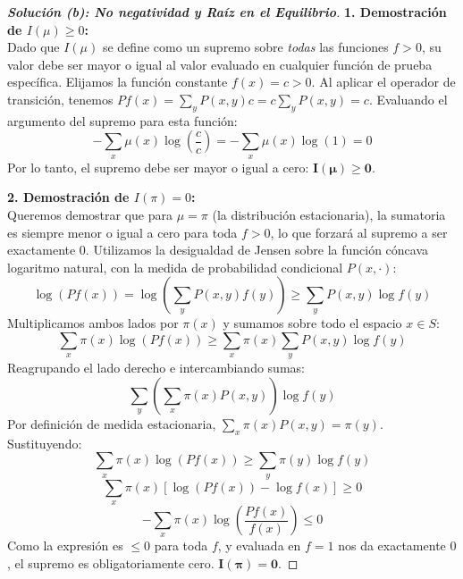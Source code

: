 \documentclass[10pt,a4paper]{article}
\begin{document}
\begin{proof}[\textbf{Solución (b): No negatividad y Raíz en el Equilibrio}]
    \textbf{1. Demostración de $I(\mu) \ge 0$:} \\
    Dado que $I(\mu)$ se define como un supremo sobre \textit{todas} las funciones $f > 0$, su valor debe ser mayor o igual al valor evaluado en cualquier función de prueba específica.
    Elijamos la función constante $f(x) = c > 0$. 
    Al aplicar el operador de transición, tenemos $Pf(x) = \sum_y P(x,y)c = c \sum_y P(x,y) = c$.
    Evaluando el argumento del supremo para esta función:
    \[ -\sum_x \mu(x) \log \left( \frac{c}{c} \right) = -\sum_x \mu(x) \log(1) = 0 \]
    Por lo tanto, el supremo debe ser mayor o igual a cero: $\mathbf{I(\mu) \ge 0}$.

    \vspace{3mm}
    \textbf{2. Demostración de $I(\pi) = 0$:} \\
    Queremos demostrar que para $\mu = \pi$ (la distribución estacionaria), la sumatoria es siempre menor o igual a cero para toda $f>0$, lo que forzará al supremo a ser exactamente 0.
    Utilizamos la desigualdad de Jensen sobre la función cóncava logaritmo natural, con la medida de probabilidad condicional $P(x, \cdot)$:
    \[ \log(Pf(x)) = \log \left( \sum_y P(x,y) f(y) \right) \ge \sum_y P(x,y) \log f(y) \]
    Multiplicamos ambos lados por $\pi(x)$ y sumamos sobre todo el espacio $x \in S$:
    \[ \sum_x \pi(x) \log(Pf(x)) \ge \sum_x \pi(x) \sum_y P(x,y) \log f(y) \]
    Reagrupando el lado derecho e intercambiando sumas:
    \[ \sum_y \left( \sum_x \pi(x) P(x,y) \right) \log f(y) \]
    Por definición de medida estacionaria, $\sum_x \pi(x) P(x,y) = \pi(y)$. Sustituyendo:
    \[ \sum_x \pi(x) \log(Pf(x)) \ge \sum_y \pi(y) \log f(y) \]
    \[ \sum_x \pi(x) [\log(Pf(x)) - \log f(x)] \ge 0 \]
    \[ -\sum_x \pi(x) \log \left( \frac{Pf(x)}{f(x)} \right) \le 0 \]
    Como la expresión es $\le 0$ para toda $f$, y evaluada en $f=1$ nos da exactamente $0$, el supremo es obligatoriamente cero. $\mathbf{I(\pi) = 0}$.
\end{proof}

\vspace{5mm}
\end{document}
